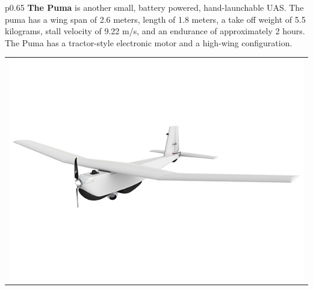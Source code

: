 \documentclass[]{article}
\begin{document}
\begin{table}[H]
\begin{minipage}[b]{0.65\linewidth}
\begin{tabular}{*{1}{p{0.65\textwidth}}}
{\bf The Puma} is another small, battery powered, hand-launchable UAS.  The puma has a wing span of 2.6 meters, length of 1.8 meters, a take off weight of 5.5 kilograms, stall velocity of 9.22 m/s, and an endurance of approximately 2 hours.  The Puma has a tractor-style electronic motor and a high-wing configuration.
\end{tabular}
\end{minipage}
\hfill
\begin{minipage}[b]{0.5\linewidth}
\begin{tabular}{*{1}{p{}}}
\includegraphics[height=8\baselineskip]{puma}
\end{tabular}
\end{minipage}
\end{table}
\end{document}
